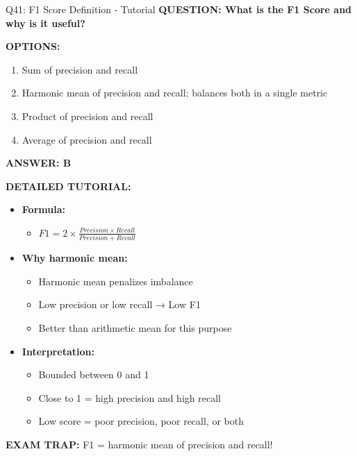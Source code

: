 \documentclass[8pt]{beamer}
\begin{document}
	\begin{frame}{Q41: F1 Score Definition - Tutorial}
		\fontsize{6.5}{7.5}\selectfont
		\textbf{QUESTION: What is the F1 Score and why is it useful?}
		
		\vspace{0.1cm}
		\textbf{OPTIONS:}
		\begin{enumerate}
			\item Sum of precision and recall
			\item Harmonic mean of precision and recall; balances both in a single metric
			\item Product of precision and recall
			\item Average of precision and recall
		\end{enumerate}
		
		\vspace{0.1cm}
		\textcolor{myblue}{\textbf{ANSWER: B}}
		
		\vspace{0.1cm}
		\textbf{DETAILED TUTORIAL:}
		\begin{itemize}
			\item \textbf{Formula:}
			\begin{itemize}
				\item $F1 = 2 \times \frac{Precision \times Recall}{Precision + Recall}$
			\end{itemize}
			\item \textbf{Why harmonic mean:}
			\begin{itemize}
				\item Harmonic mean penalizes imbalance
				\item Low precision or low recall → Low F1
				\item Better than arithmetic mean for this purpose
			\end{itemize}
			\item \textbf{Interpretation:}
			\begin{itemize}
				\item Bounded between 0 and 1
				\item Close to 1 = high precision and high recall
				\item Low score = poor precision, poor recall, or both
			\end{itemize}
		\end{itemize}
		
		\textcolor{myred}{\textbf{EXAM TRAP:}} F1 = \textcolor{myblue}{harmonic mean of precision and recall}!
	\end{frame}
	
\end{document}
